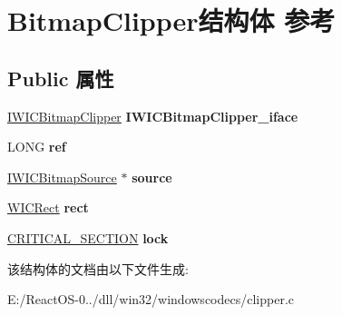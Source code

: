 \hypertarget{struct_bitmap_clipper}{}\section{Bitmap\+Clipper结构体 参考}
\label{struct_bitmap_clipper}
\subsection*{Public 属性}
\begin{DoxyCompactItemize}
\item 
\mbox{\label{struct_bitmap_clipper_a6bd3058a08129195dff0a8bc2c5499a3}} 
\hyperlink{interface_i_w_i_c_bitmap_clipper}{I\+W\+I\+C\+Bitmap\+Clipper} {\bfseries I\+W\+I\+C\+Bitmap\+Clipper\+\_\+iface}
\item 
\mbox{\label{struct_bitmap_clipper_af629c67b29af2978086852fcf245bed8}} 
L\+O\+NG {\bfseries ref}
\item 
\mbox{\label{struct_bitmap_clipper_ae9d1875001414ab2bd957e17fd6fa8df}} 
\hyperlink{interface_i_w_i_c_bitmap_source}{I\+W\+I\+C\+Bitmap\+Source} $\ast$ {\bfseries source}
\item 
\mbox{\label{struct_bitmap_clipper_a1649e4a6e9309f1d38291028dee5388a}} 
\hyperlink{struct_w_i_c_rect}{W\+I\+C\+Rect} {\bfseries rect}
\item 
\mbox{\label{struct_bitmap_clipper_aa749543cdc5b0bad1f17c3ab607f2ca3}} 
\hyperlink{struct___c_r_i_t_i_c_a_l___s_e_c_t_i_o_n}{C\+R\+I\+T\+I\+C\+A\+L\+\_\+\+S\+E\+C\+T\+I\+ON} {\bfseries lock}
\end{DoxyCompactItemize}


该结构体的文档由以下文件生成\+:\begin{DoxyCompactItemize}
\item 
E\+:/\+React\+O\+S-\/0../dll/win32/windowscodecs/clipper.\+c\end{DoxyCompactItemize}
